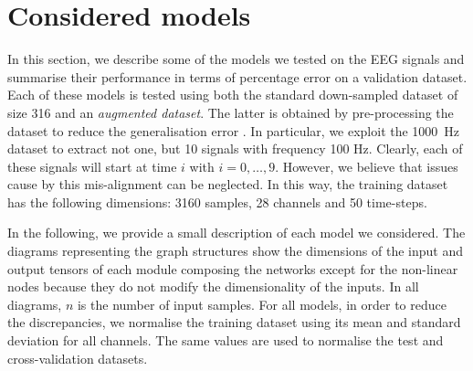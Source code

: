 \documentclass{article}
\begin{document}
 

 \section{Considered models}\label{sec_allmodel}
 In this section, we describe some of the models we tested on the EEG signals and summarise their performance in terms of percentage error on a validation dataset. 
 Each of these models is tested using both the standard down-sampled dataset of size 316 and an \emph{augmented dataset}. 
 The latter is obtained by pre-processing the dataset to reduce the generalisation error \cite{goodfellow2016deep}. 
 In particular, we exploit the 1000~Hz dataset to extract not one, but 10  signals with frequency 100 Hz. 
Clearly, each of these signals will start at time $i$ with $i=0,\dots,9$. 
However, we believe that  issues cause by this mis-alignment can be neglected. 
In this way, the training dataset has the following dimensions: 3160 samples, 28 channels and 50 time-steps. 

In the following, we provide a small description of each model we considered. 
The diagrams representing the graph structures show the dimensions of the input and output tensors of each module composing the networks except for the non-linear nodes because they do not modify the dimensionality of the inputs.
In all diagrams, $n$ is the number of input samples.
For all models,    in order to reduce the discrepancies, we  normalise the training dataset using its mean and standard deviation for all channels. 
  The same values are used to normalise the test and cross-validation datasets. 
\end{document}
